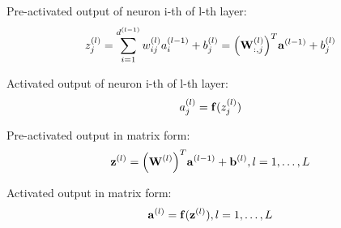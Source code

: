 \documentclass[14pt, a4paper]{article}
\numberwithin{equation}{section}
\numberwithin{algorithm}{section}
\numberwithin{figure}{section}
\begin{document}
Pre-activated output of neuron i-th of l-th layer:
\begin{equation}
	  z_j^{(l)}=\sum_{i=1}^{d^{(l-1)}}w_{ij}^{(l)}a_i^{(l-1)}+b_j^{(l)}=\Big(\bold{W}_{:,j}^{(l)}\Big)^T \bold{a}^{(l-1)} + b_j^{(l)}
\end{equation}

Activated output of neuron i-th of l-th layer:
\begin{equation}
	  a_j^{(l)} = \bold{f}(z_j^{(l)})
\end{equation}

Pre-activated output in matrix form:
\begin{equation}
	  \bold{z}^{(l)}=\Big(\bold{W}^{(l)}\Big)^T\bold{a}^{(l-1)} + \bold{b}^{(l)}, l=1, \dots, L
\end{equation}

Activated output in matrix form:
\begin{equation}
	  \bold{a}^{(l)}=\bold{f}(\bold{z}^{(l)}), l=1, \dots, L
\end{equation}
\end{document}
